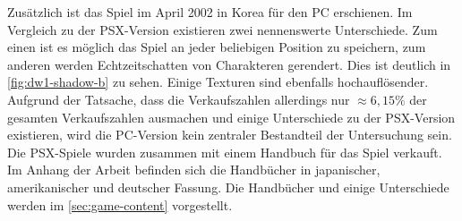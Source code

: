 Zusätzlich ist das Spiel im April 2002 in Korea für den PC erschienen\cite{korea-multi}. Im Vergleich zu der \ac{PSX}-Version existieren zwei nennenswerte Unterschiede. Zum einen ist es möglich das Spiel an jeder beliebigen Position zu speichern, zum anderen werden Echtzeitschatten von Charakteren gerendert. Dies ist deutlich in \autoref{fig:dw1-shadow-b} zu sehen. Einige Texturen sind ebenfalls hochauflösender.\\

Aufgrund der Tatsache, dass die Verkaufszahlen allerdings nur $\approx 6{,}15\%$ der gesamten Verkaufszahlen ausmachen und einige Unterschiede zu der \ac{PSX}-Version existieren, wird die PC-Version kein zentraler Bestandteil der Untersuchung sein\cite{vgchartz}. Die \ac{PSX}-Spiele wurden zusammen mit einem Handbuch für das Spiel verkauft. Im Anhang der Arbeit befinden sich die Handbücher in japanischer, amerikanischer und deutscher Fassung. Die Handbücher und einige Unterschiede werden im \autoref{sec:game-content} vorgestellt.\\